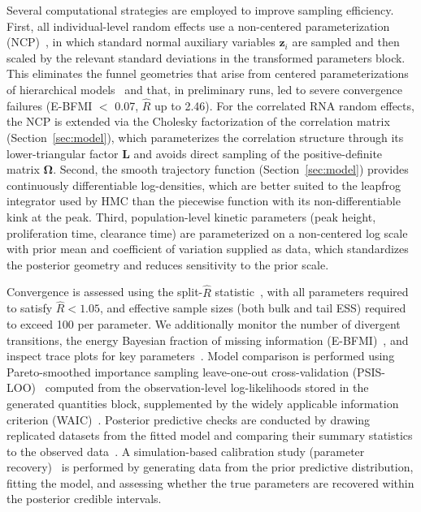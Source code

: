 \documentclass[12pt]{article}
\begin{document}
Several computational strategies are employed to improve sampling efficiency. First, all individual-level random effects use a non-centered parameterization (NCP)~\cite{papaspiliopoulos2007general}, in which standard normal auxiliary variables $\mathbf{z}_i$ are sampled and then scaled by the relevant standard deviations in the transformed parameters block. This eliminates the funnel geometries that arise from centered parameterizations of hierarchical models~\cite{neal2003slice,betancourt2016diagnosing} and that, in preliminary runs, led to severe convergence failures (E-BFMI $<$ 0.07, $\hat{R}$ up to 2.46). For the correlated RNA random effects, the NCP is extended via the Cholesky factorization of the correlation matrix (Section~\ref{sec:model}), which parameterizes the correlation structure through its lower-triangular factor $\mathbf{L}$ and avoids direct sampling of the positive-definite matrix $\boldsymbol{\Omega}$. Second, the smooth trajectory function (Section~\ref{sec:model}) provides continuously differentiable log-densities, which are better suited to the leapfrog integrator used by HMC than the piecewise function with its non-differentiable kink at the peak. Third, population-level kinetic parameters (peak height, proliferation time, clearance time) are parameterized on a non-centered log scale with prior mean and coefficient of variation supplied as data, which standardizes the posterior geometry and reduces sensitivity to the prior scale. %

Convergence is assessed using the split-$\hat{R}$ statistic~\cite{vehtari2021rank}, with all parameters required to satisfy $\hat{R} < 1.05$, and effective sample sizes (both bulk and tail ESS) required to exceed 100 per parameter. We additionally monitor the number of divergent transitions, the energy Bayesian fraction of missing information (E-BFMI)~\cite{betancourt2016diagnosing}, and inspect trace plots for key parameters~\cite{gabry2019visualization}. Model comparison is performed using Pareto-smoothed importance sampling leave-one-out cross-validation (PSIS-LOO)~\cite{vehtari2024pareto,vehtari2017practical} computed from the observation-level log-likelihoods stored in the generated quantities block, supplemented by the widely applicable information criterion (WAIC)~\cite{watanabe2010asymptotic}. Posterior predictive checks are conducted by drawing replicated datasets from the fitted model and comparing their summary statistics to the observed data~\cite{gabry2019visualization}. A simulation-based calibration study (parameter recovery)~\cite{talts2018validating} is performed by generating data from the prior predictive distribution, fitting the model, and assessing whether the true parameters are recovered within the posterior credible intervals.
\end{document}

